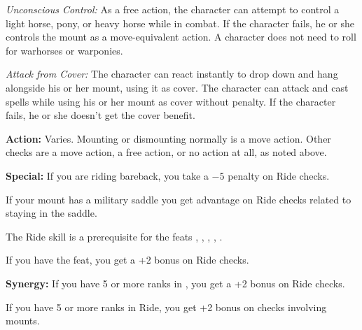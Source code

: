 \textit{Unconscious Control:} As a free action, the character can attempt to control a light horse, pony, or heavy horse while in combat. If the character fails, he or she controls the mount as a move-equivalent action. A character does not need to roll for warhorses or warponies.

\textit{Attack from Cover:} The character can react instantly to drop down and hang alongside his or her mount, using it as cover. The character can attack and cast spells while using his or her mount as cover without penalty. If the character fails, he or she doesn’t get the cover benefit.

\textbf{Action:} Varies. Mounting or dismounting normally is a move action. Other checks are a move action, a free action, or no action at all, as noted above.

\textbf{Special:} If you are riding bareback, you take a $-5$ penalty on Ride checks.

If your mount has a military saddle you get advantage on Ride checks related to staying in the saddle.

The Ride skill is a prerequisite for the feats , , , , .

If you have the  feat, you get a +2 bonus on Ride checks.

\textbf{Synergy:} If you have 5 or more ranks in , you get a +2 bonus on Ride checks.

If you have 5 or more ranks in Ride, you get +2 bonus on  checks involving mounts.
